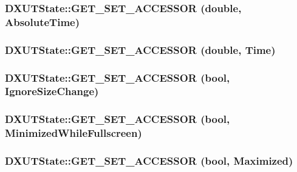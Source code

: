 \label{class_d_x_u_t_state_a648316ed44cdbdbe6b7e4e7edb4baf84}
\hypertarget{class_d_x_u_t_state_a63afe2875d0d29822bdd8abdbc2c5bcb}{
\subsubsection[{GET\_\-SET\_\-ACCESSOR}]{\setlength{\rightskip}{0pt plus 5cm}DXUTState::GET\_\-SET\_\-ACCESSOR (double, \/  AbsoluteTime)}}
\label{class_d_x_u_t_state_a63afe2875d0d29822bdd8abdbc2c5bcb}
\hypertarget{class_d_x_u_t_state_a9928c8caea52f9375d6c9ec2bf49264d}{
\subsubsection[{GET\_\-SET\_\-ACCESSOR}]{\setlength{\rightskip}{0pt plus 5cm}DXUTState::GET\_\-SET\_\-ACCESSOR (double, \/  Time)}}
\label{class_d_x_u_t_state_a9928c8caea52f9375d6c9ec2bf49264d}
\hypertarget{class_d_x_u_t_state_ae22f397c5dcea02a491307d4a8627673}{
\subsubsection[{GET\_\-SET\_\-ACCESSOR}]{\setlength{\rightskip}{0pt plus 5cm}DXUTState::GET\_\-SET\_\-ACCESSOR (bool, \/  IgnoreSizeChange)}}
\label{class_d_x_u_t_state_ae22f397c5dcea02a491307d4a8627673}
\hypertarget{class_d_x_u_t_state_a07cafa9805d4a519c5d8f3b3dd174325}{
\subsubsection[{GET\_\-SET\_\-ACCESSOR}]{\setlength{\rightskip}{0pt plus 5cm}DXUTState::GET\_\-SET\_\-ACCESSOR (bool, \/  MinimizedWhileFullscreen)}}
\label{class_d_x_u_t_state_a07cafa9805d4a519c5d8f3b3dd174325}
\hypertarget{class_d_x_u_t_state_a500e3875a183dcaa6c0cb0a2cdc74cc1}{
\subsubsection[{GET\_\-SET\_\-ACCESSOR}]{\setlength{\rightskip}{0pt plus 5cm}DXUTState::GET\_\-SET\_\-ACCESSOR (bool, \/  Maximized)}}
